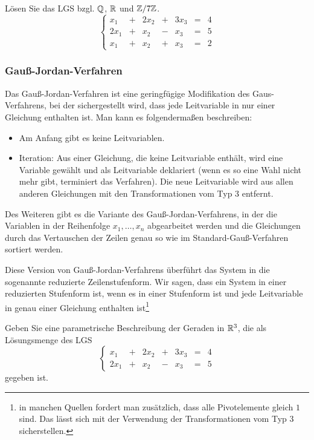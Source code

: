 \begin{appendices}
\begin{bsp}
	Lösen Sie das LGS bzgl. $\mathbb Q$, $\mathbb R$ und $\mathbb Z / 7 \mathbb Z$. 
	\[
	\left\{
	\begin{array}{ccccccc}
		 x_1 &  +&  2 x_2 & + & 3 x_3 &  = & 4
\\		 2 x_1 & + & x_2 & -&  x_3 & =&  5
\\		 x_1 & + & x_2 & + & x_3 & = & 2
	\end{array}\right. 
	\]
\end{bsp} 

\subsubsection{Gauß-Jordan-Verfahren}

Das Gauß-Jordan-Verfahren ist eine geringfügige Modifikation des Gaus-Verfahrens, bei der sichergestellt wird, dass jede Leitvariable in nur einer Gleichung enthalten ist. Man kann es folgendermaßen beschreiben: 

\begin{framed}
\begin{itemize} 
	\item Am Anfang gibt es keine Leitvariablen. 
	\item Iteration: Aus einer Gleichung, die keine Leitvariable enthält, wird eine Variable gewählt und als Leitvariable deklariert (wenn es so eine Wahl nicht mehr gibt, terminiert das Verfahren). Die neue Leitvariable wird aus allen anderen Gleichungen mit den Transformationen vom Typ 3 entfernt. 
\end{itemize} 
\end{framed} 

Des Weiteren gibt es die Variante des Gauß-Jordan-Verfahrens, in der die Variablen in der Reihenfolge $x_1,\ldots,x_n$ abgearbeitet werden und die Gleichungen durch das Vertauschen der Zeilen genau so wie im Standard-Gauß-Verfahren sortiert werden. 

Diese Version von Gauß-Jordan-Verfahrens  überführt das System in die sogenannte reduzierte Zeilenstufenform. Wir sagen, dass ein System in einer reduzierten Stufenform ist, wenn es in einer Stufenform ist und jede Leitvariable in genau einer Gleichung enthalten ist\footnote{in manchen Quellen fordert man zusätzlich, dass alle Pivotelemente gleich $1$ sind. Das lässt sich mit der Verwendung der Transformationen vom Typ 3 sicherstellen.}

\begin{bsp}
	Geben Sie eine parametrische Beschreibung der Geraden in $\mathbb R^3$, die als Lösungsmenge des LGS
	\[
	\left\{
\begin{array}{ccccccc}
	x_1 &  +&  2 x_2 & + & 3 x_3 &  = & 4
	\\		 2 x_1 & + & x_2 & -&  x_3 & =&  5
\end{array}\right. 
	\]
	gegeben ist. 
\end{bsp} 

\end{appendices}
